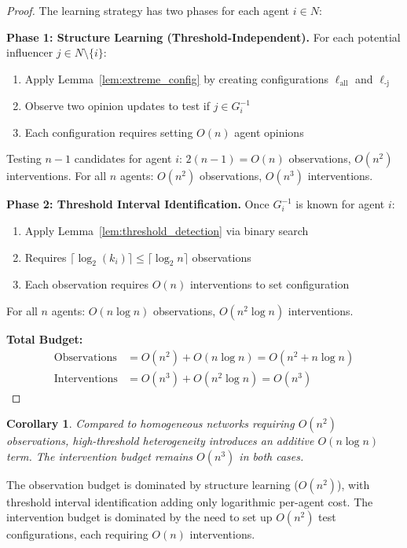 \documentclass[conference]{IEEEtran}
\newtheorem{corollary}{Corollary}
\begin{document}
\begin{proof}
The learning strategy has two phases for each agent $i \in N$:

\textbf{Phase 1: Structure Learning (Threshold-Independent).} For each potential influencer $j \in N \setminus \{i\}$:
\begin{enumerate}
\item Apply Lemma~\ref{lem:extreme_config} by creating configurations $\ell_{\text{all}}$ and $\ell_{\text{-j}}$
\item Observe two opinion updates to test if $j \in G^{-1}_i$
\item Each configuration requires setting $O(n)$ agent opinions
\end{enumerate}

Testing $n-1$ candidates for agent $i$: $2(n-1) = O(n)$ observations, $O(n^2)$ interventions.
For all $n$ agents: $O(n^2)$ observations, $O(n^3)$ interventions.

\textbf{Phase 2: Threshold Interval Identification.} Once $G^{-1}_i$ is known for agent $i$:
\begin{enumerate}
\item Apply Lemma~\ref{lem:threshold_detection} via binary search
\item Requires $\lceil \log_2(k_i) \rceil \leq \lceil \log_2 n \rceil$ observations
\item Each observation requires $O(n)$ interventions to set configuration
\end{enumerate}

For all $n$ agents: $O(n \log n)$ observations, $O(n^2 \log n)$ interventions.

\textbf{Total Budget:}
\begin{align*}
\text{Observations} &= O(n^2) + O(n \log n) = O(n^2 + n \log n) \\
\text{Interventions} &= O(n^3) + O(n^2 \log n) = O(n^3)
\end{align*}
\end{proof}

\begin{corollary}
\label{cor:comparison}
Compared to homogeneous networks \cite{chistikov2020convergence} requiring $O(n^2)$ observations, high-threshold heterogeneity introduces an additive $O(n \log n)$ term. The intervention budget remains $O(n^3)$ in both cases.
\end{corollary}

The observation budget is dominated by structure learning ($O(n^2)$), with threshold interval identification adding only logarithmic per-agent cost. The intervention budget is dominated by the need to set up $O(n^2)$ test configurations, each requiring $O(n)$ interventions.
\end{document}
